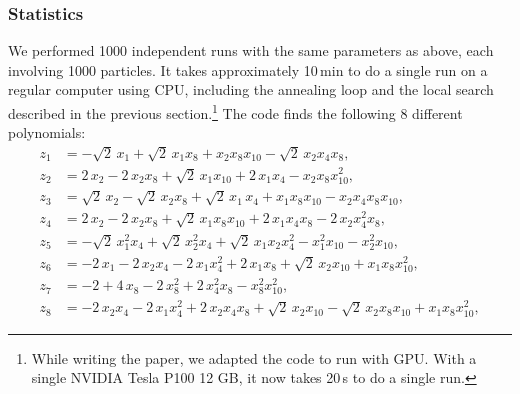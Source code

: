 \documentclass[11pt,a4paper]{article}
\begin{document}
	\subsubsection{Statistics}
	We performed 1000 independent runs with the same parameters as above, each involving 1000 particles. It takes approximately 10\,min to do a single run on a regular computer using CPU, including the annealing loop and the local search described in the previous section.\footnote{While writing the paper, we adapted the code to run with GPU. With a single NVIDIA Tesla P100 12 GB, it now takes 20\,s to do a single run.} The code finds the following 8 different polynomials:
	\begin{subequations} \label{eq:pols}
	 \begin{align}
	   z_{1} &= -\sqrt{2}\,x_{1} + \sqrt{2}\,x_{1}x_8 + x_{2}x_8x_{10} - \sqrt{2}\,x_{2}x_{4}x_8,\\[4pt]
	   z_{2} &= 2\,x_{2} - 2\,x_{2}x_8 + \sqrt{2}\,x_{1}x_{10} + 2\,x_{1}x_{4} - x_{2}x_8x_{10}^{2},\\[4pt]
	   z_{3} &= \sqrt{2}\,x_{2} - \sqrt{2}\,x_{2}x_8 + \sqrt{2}\,x_{1}\,x_{4} + x_{1}x_8x_{10}
	   		- x_{2}x_{4}x_8x_{10},\\[4pt]
	   z_{4} &= 2\,x_{2} - 2\,x_{2}x_8 + \sqrt{2}\,x_{1}x_8x_{10} + 2\,x_{1}x_{4}x_8
	   		- 2\,x_{2} x_{4}^{2}x_8,\\[4pt]
	   z_{5} &= -\sqrt{2}\,x_{1}^{2}x_{4} + \sqrt{2}\,x_{2}^{2}x_{4} + \sqrt{2}\,x_{1}x_{2}x_{4}^{2} - x_{1}^{2}x_{10}
	   		- x_{2}^{2}x_{10}, \\[4pt]
	   z_{6} &= -2\,x_{1} - 2\,x_{2}x_{4}- 2\,x_{1}x_{4}^{2} + 2\,x_{1}x_8 + \sqrt{2}\,x_{2}x_{10}
	   		+ x_{1}x_8x_{10}^{2},\\[4pt]
	   z_{7} &= -2 + 4\,x_{8} - 2\,x_8^2 + 2\,x_{4}^2 x_8 - x_8^2 x_{10}^2,\\[4pt]
	   z_{8} &= -2\,x_{2}x_{4} - 2\,x_{1}x_{4}^{2} + 2\,x_{2}x_{4}x_8 + \sqrt{2}\,x_{2}x_{10} 
	   		- \sqrt{2}\,x_{2}x_8x_{10} +  x_{1}x_8x_{10}^{2},
	 \end{align}
	\end{subequations}
\end{document}
